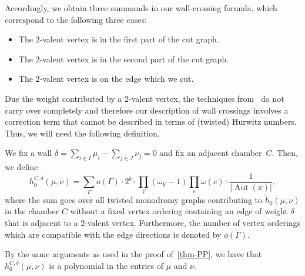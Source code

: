 \documentclass[ALCO,published]{cedram}
\DeclareMathOperator{\Aut}{Aut}
\begin{document}
Accordingly, we obtain three summands in our wall-crossing formula, which correspond to the following three cases:

\begin{itemize}
    \item The $2$-valent vertex is in the first part of the cut graph.
    \item The $2$-valent vertex is in the second part of the cut graph.
    \item The $2$-valent vertex is on the edge which we cut.
\end{itemize}

Due the weight contributed by a $2$-valent vertex, the techniques from~\cite{CJM10} do not carry over completely and therefore our description of wall crossings involves a correction term that cannot be described in terms of (twisted) Hurwitz numbers. Thus, we will need the following definition.

\begin{defi}
We fix a wall $\delta=\sum_{i\in I}\mu_i - \sum_{j\in J}\nu_j=0$ and fix an adjacent chamber~$C$. Then, we define 
\begin{equation*}
    h_0^{C,\delta}(\mu,\nu)=\sum_{\Gamma} o(\Gamma) \cdot 2^{b}\cdot \prod_V (\omega_V-1)\prod_e\omega(e)\cdot \frac{1}{|\Aut(\pi)|},
\end{equation*}
where  the sum goes over all twisted monodromy graphs contributing to $\tilde{h}_0(\mu,\nu)$ in the chamber $C$ without a fixed vertex ordering containing an edge of weight $\delta$ that is adjacent to a $2$-valent vertex. Furthermore, the number of vertex orderings which are compatible with the edge directions is denoted by $o(\Gamma)$.
\end{defi}

By the same arguments as used in the proof of~\cref{thm-PP}, we have that $h_0^{C,\delta}(\mu,\nu)$ is a polynomial in the entries of $\mu$ and $\nu$.
\end{document}
